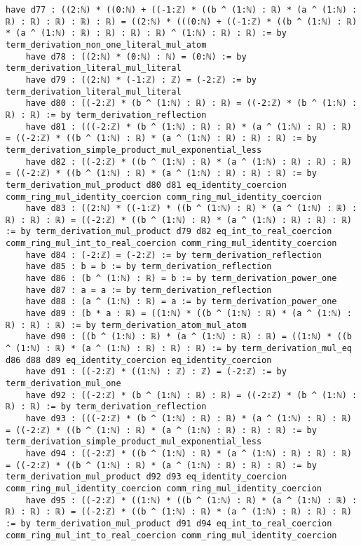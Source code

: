 \documentclass{article}
\begin{document}
\begin{tcolorbox}[colback=white!10, width=\linewidth]
\begin{lstlisting}[language=Lean4]
    have d77 : ((2:ℕ) * ((0:ℕ) + ((-1:ℤ) * ((b ^ (1:ℕ) : ℝ) * (a ^ (1:ℕ) : ℝ) : ℝ) : ℝ) : ℝ) : ℝ) = ((2:ℕ) * (((0:ℕ) + ((-1:ℤ) * ((b ^ (1:ℕ) : ℝ) * (a ^ (1:ℕ) : ℝ) : ℝ) : ℝ) : ℝ) ^ (1:ℕ) : ℝ) : ℝ) := by term_derivation_non_one_literal_mul_atom
    have d78 : ((2:ℕ) * (0:ℕ) : ℕ) = (0:ℕ) := by term_derivation_literal_mul_literal
    have d79 : ((2:ℕ) * (-1:ℤ) : ℤ) = (-2:ℤ) := by term_derivation_literal_mul_literal
    have d80 : ((-2:ℤ) * (b ^ (1:ℕ) : ℝ) : ℝ) = ((-2:ℤ) * (b ^ (1:ℕ) : ℝ) : ℝ) := by term_derivation_reflection
    have d81 : (((-2:ℤ) * (b ^ (1:ℕ) : ℝ) : ℝ) * (a ^ (1:ℕ) : ℝ) : ℝ) = ((-2:ℤ) * ((b ^ (1:ℕ) : ℝ) * (a ^ (1:ℕ) : ℝ) : ℝ) : ℝ) := by term_derivation_simple_product_mul_exponential_less
    have d82 : ((-2:ℤ) * ((b ^ (1:ℕ) : ℝ) * (a ^ (1:ℕ) : ℝ) : ℝ) : ℝ) = ((-2:ℤ) * ((b ^ (1:ℕ) : ℝ) * (a ^ (1:ℕ) : ℝ) : ℝ) : ℝ) := by term_derivation_mul_product d80 d81 eq_identity_coercion comm_ring_mul_identity_coercion comm_ring_mul_identity_coercion
    have d83 : ((2:ℕ) * ((-1:ℤ) * ((b ^ (1:ℕ) : ℝ) * (a ^ (1:ℕ) : ℝ) : ℝ) : ℝ) : ℝ) = ((-2:ℤ) * ((b ^ (1:ℕ) : ℝ) * (a ^ (1:ℕ) : ℝ) : ℝ) : ℝ) := by term_derivation_mul_product d79 d82 eq_int_to_real_coercion comm_ring_mul_int_to_real_coercion comm_ring_mul_identity_coercion
    have d84 : (-2:ℤ) = (-2:ℤ) := by term_derivation_reflection
    have d85 : b = b := by term_derivation_reflection
    have d86 : (b ^ (1:ℕ) : ℝ) = b := by term_derivation_power_one
    have d87 : a = a := by term_derivation_reflection
    have d88 : (a ^ (1:ℕ) : ℝ) = a := by term_derivation_power_one
    have d89 : (b * a : ℝ) = ((1:ℕ) * ((b ^ (1:ℕ) : ℝ) * (a ^ (1:ℕ) : ℝ) : ℝ) : ℝ) := by term_derivation_atom_mul_atom
    have d90 : ((b ^ (1:ℕ) : ℝ) * (a ^ (1:ℕ) : ℝ) : ℝ) = ((1:ℕ) * ((b ^ (1:ℕ) : ℝ) * (a ^ (1:ℕ) : ℝ) : ℝ) : ℝ) := by term_derivation_mul_eq d86 d88 d89 eq_identity_coercion eq_identity_coercion
    have d91 : ((-2:ℤ) * ((1:ℕ) : ℤ) : ℤ) = (-2:ℤ) := by term_derivation_mul_one
    have d92 : ((-2:ℤ) * (b ^ (1:ℕ) : ℝ) : ℝ) = ((-2:ℤ) * (b ^ (1:ℕ) : ℝ) : ℝ) := by term_derivation_reflection
    have d93 : (((-2:ℤ) * (b ^ (1:ℕ) : ℝ) : ℝ) * (a ^ (1:ℕ) : ℝ) : ℝ) = ((-2:ℤ) * ((b ^ (1:ℕ) : ℝ) * (a ^ (1:ℕ) : ℝ) : ℝ) : ℝ) := by term_derivation_simple_product_mul_exponential_less
    have d94 : ((-2:ℤ) * ((b ^ (1:ℕ) : ℝ) * (a ^ (1:ℕ) : ℝ) : ℝ) : ℝ) = ((-2:ℤ) * ((b ^ (1:ℕ) : ℝ) * (a ^ (1:ℕ) : ℝ) : ℝ) : ℝ) := by term_derivation_mul_product d92 d93 eq_identity_coercion comm_ring_mul_identity_coercion comm_ring_mul_identity_coercion
    have d95 : ((-2:ℤ) * ((1:ℕ) * ((b ^ (1:ℕ) : ℝ) * (a ^ (1:ℕ) : ℝ) : ℝ) : ℝ) : ℝ) = ((-2:ℤ) * ((b ^ (1:ℕ) : ℝ) * (a ^ (1:ℕ) : ℝ) : ℝ) : ℝ) := by term_derivation_mul_product d91 d94 eq_int_to_real_coercion comm_ring_mul_int_to_real_coercion comm_ring_mul_identity_coercion

\end{lstlisting}
\end{tcolorbox}
\end{document}
